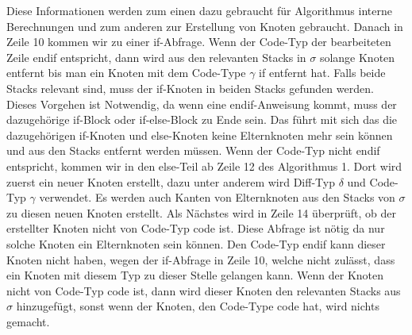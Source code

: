 Diese Informationen werden zum einen dazu gebraucht für Algorithmus interne Berechnungen und zum anderen zur Erstellung von Knoten gebraucht. Danach in Zeile 10 kommen wir zu einer if-Abfrage. Wenn der Code-Typ der bearbeiteten Zeile endif entspricht, dann wird aus den relevanten Stacks in $\sigma$ solange Knoten entfernt bis man ein Knoten mit dem Code-Type $\gamma$ if entfernt hat. Falls beide Stacks relevant sind, muss der if-Knoten in beiden Stacks gefunden werden. Dieses Vorgehen ist Notwendig, da wenn eine endif-Anweisung kommt, muss der dazugehörige if-Block oder if-else-Block zu Ende sein. Das führt mit sich das die dazugehörigen if-Knoten und else-Knoten keine Elternknoten mehr sein können und aus den Stacks entfernt werden müssen. Wenn der Code-Typ nicht endif entspricht, kommen wir in den else-Teil ab Zeile 12 des Algorithmus 1. Dort wird zuerst ein neuer Knoten erstellt, dazu unter anderem wird Diff-Typ $\delta$ und Code-Typ $\gamma$ verwendet. Es werden auch Kanten von Elternknoten aus den Stacks von $\sigma$ zu diesen neuen Knoten erstellt. Als Nächstes wird in Zeile 14 überprüft, ob der erstellter Knoten nicht von Code-Typ code ist. Diese Abfrage ist nötig da nur solche Knoten ein Elternknoten sein können. Den Code-Typ endif kann dieser Knoten nicht haben, wegen der if-Abfrage in Zeile 10, welche nicht zulässt, dass ein Knoten mit diesem Typ zu dieser Stelle gelangen kann.  Wenn der Knoten nicht von Code-Typ code ist, dann wird dieser Knoten den relevanten Stacks aus $\sigma$ hinzugefügt, sonst wenn der Knoten, den Code-Type code hat, wird nichts gemacht.\\


